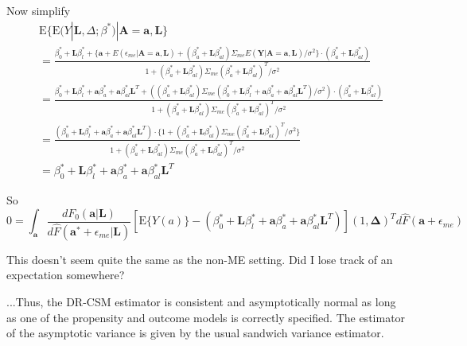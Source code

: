 \documentclass[12pt]{article}
\begin{document}
Now simplify
\begin{align*}
&\text{E} \{ \text{E}(Y | \textbf{L}, \Delta; \beta^{*}) | \textbf{A} = \textbf{a}, \textbf{L} \} \\
&= \frac{\beta_{0}^{*} + \textbf{L}\beta_{l}^{*} + \{ \textbf{a} + E(\epsilon_{me} | \bm{A} = \bm{a}, \bm{L}) + (\beta_{a}^{*} + \textbf{L}\beta_{al}^{*}) \Sigma_{me} E( \textbf{Y} | \bm{A} = \bm{a}, \bm{L}) / \sigma^{2} \} \cdot (\beta_{a}^{*} + \textbf{L}\beta_{al}^{*})}{1 + (\beta_{a}^{*} + \textbf{L}\beta_{al}^{*}) \Sigma_{me} (\beta_{a}^{*} + \textbf{L}\beta_{al}^{*})^{T} / \sigma^{2}} \\
&= \frac{\beta_{0}^{*} + \textbf{L}\beta_{l}^{*} + \textbf{a}\beta_{a}^{*} + \textbf{a}\beta_{al}^{*}\textbf{L}^{T} + ((\beta_{a}^{*} + \textbf{L}\beta_{al}^{*}) \Sigma_{me} (\beta_{0}^{*} + \textbf{L}\beta_{l}^{*} + \textbf{a}\beta_{a}^{*} + \textbf{a}\beta_{al}^{*}\textbf{L}^{T}) / \sigma^{2}) \cdot (\beta_{a}^{*} + \textbf{L}\beta_{al}^{*})}{1 + (\beta_{a}^{*} + \textbf{L}\beta_{al}^{*}) \Sigma_{me} (\beta_{a}^{*} + \textbf{L}\beta_{al}^{*})^{T} / \sigma^{2}} \\
&= \frac{(\beta_{0}^{*} + \textbf{L}\beta_{l}^{*} + \textbf{a}\beta_{a}^{*} + \textbf{a}\beta_{al}^{*}\textbf{L}^{T}) \cdot \{ 1 + (\beta_{a}^{*} + \textbf{L}\beta_{al}^{*}) \Sigma_{me} (\beta_{a}^{*} + \textbf{L}\beta_{al}^{*})^{T} / \sigma^{2} \}}{1 + (\beta_{a}^{*} + \textbf{L}\beta_{al}^{*}) \Sigma_{me} (\beta_{a}^{*} + \textbf{L}\beta_{al}^{*})^{T} / \sigma^{2}} \\
&= \beta_{0}^{*} + \textbf{L}\beta_{l}^{*} + \textbf{a}\beta_{a}^{*} + \textbf{a}\beta_{al}^{*}\textbf{L}^{T}
\end{align*}

So
\begin{equation*}
0 = \int_{\bm{a}} \frac{dF_{0}(\bm{a} | \bm{L})}{d\hat{F}(\bm{a}^{*} + \epsilon_{me} | \bm{L})} [ \text{E} \{ Y(a) \} - (\beta_{0}^{*} + \textbf{L}\beta_{l}^{*} + \textbf{a}\beta_{a}^{*} + \textbf{a}\beta_{al}^{*}\textbf{L}^{T}) ] (1, \bm{\Delta})^{T} d\hat{F}(\bm{a} + \epsilon_{me})
\end{equation*}

This doesn't seem quite the same as the non-ME setting. Did I lose track of an expectation somewhere?

...Thus, the DR-CSM estimator is consistent and asymptotically normal as long as one of the propensity and outcome models is correctly specified. The estimator of the asymptotic variance is given by the usual sandwich variance estimator.
\end{document}
